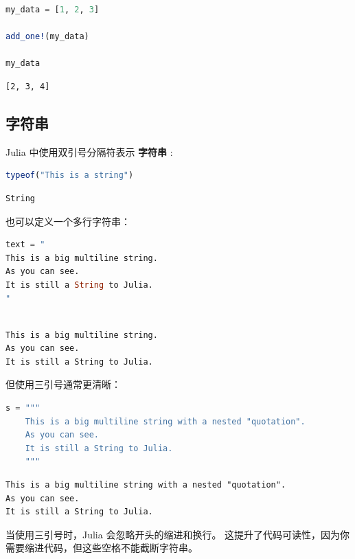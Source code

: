 \documentclass[
  notoc %
]{tufte-book}
\begin{document}
\begin{lstlisting}[language=Julia]
my_data = [1, 2, 3]

add_one!(my_data)

my_data
\end{lstlisting}

\begin{lstlisting}[language=Output]
[2, 3, 4]
\end{lstlisting}

\hypertarget{sec:string}{%
\subsection{字符串}\label{sec:string}}

Julia 中使用双引号分隔符表示 \textbf{字符串} :

\begin{lstlisting}[language=Julia]
typeof("This is a string")
\end{lstlisting}

\begin{lstlisting}[language=Output]
String
\end{lstlisting}

也可以定义一个多行字符串：

\begin{lstlisting}[language=Julia]
text = "
This is a big multiline string.
As you can see.
It is still a String to Julia.
"
\end{lstlisting}

\begin{lstlisting}[language=Output]

This is a big multiline string.
As you can see.
It is still a String to Julia.

\end{lstlisting}

但使用三引号通常更清晰：

\begin{lstlisting}[language=Julia]
s = """
    This is a big multiline string with a nested "quotation".
    As you can see.
    It is still a String to Julia.
    """
\end{lstlisting}

\begin{lstlisting}[language=Output]
This is a big multiline string with a nested "quotation".
As you can see.
It is still a String to Julia.

\end{lstlisting}

当使用三引号时，Julia 会忽略开头的缩进和换行。
这提升了代码可读性，因为你需要缩进代码，但这些空格不能截断字符串。
\end{document}
